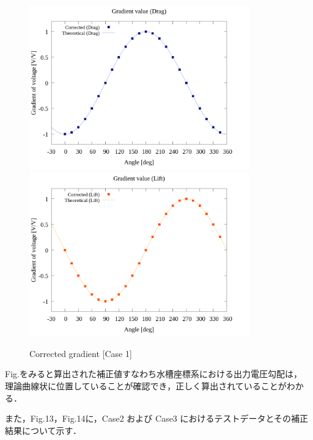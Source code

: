 \begin{figure}[htbp]
  \begin{center}
    \includegraphics[width=95mm]{../../02_workspace/result/rotation_tx=15.0_ty=20.0/plot/21/21-4_corrected_angle_drag.png}
    \includegraphics[width=95mm]{../../02_workspace/result/rotation_tx=15.0_ty=20.0/plot/21/21-4_corrected_angle_lift.png}
  \end{center}
  \caption{Corrected gradient [Case 1]}
\end{figure}

Fig.をみると算出された補正値すなわち水槽座標系における出力電圧勾配は，
理論曲線状に位置していることが確認でき，正しく算出されていることがわかる．

\newpage
また，Fig.13，Fig.14に，Case2 および Case3 におけるテストデータとその補正結果について示す．

